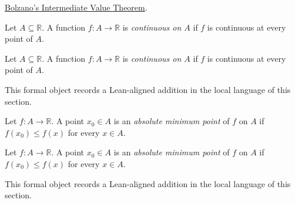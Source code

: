 \begin{dependencies}
\hyperref[thm:bolzano-intermediate-value]{Bolzano's Intermediate Value Theorem}.
\end{dependencies}

\begin{definition}
\label{def:continuous-on}
Let $A\subseteq\mathbb R$. A function $f:A\to\mathbb R$ is \emph{continuous on $A$} if $f$ is continuous at every point of $A$.
\end{definition}

\begin{remark*}
Let $A\subseteq\mathbb R$. A function $f:A\to\mathbb R$ is \emph{continuous on $A$} if $f$ is continuous at every point of $A$.
\end{remark*}

\begin{remark*}[Interpretation]
This formal object records a Lean-aligned addition in the local language of this section.
\end{remark*}

\begin{dependencies}
\NoLocalDependencies
\end{dependencies}
\begin{definition}
\label{def:is-absolute-minimum}
Let $f:A\to\mathbb R$. A point $x_0\in A$ is an \emph{absolute minimum point} of $f$ on $A$ if $f(x_0)\le f(x)$ for every $x\in A$.
\end{definition}

\begin{remark*}
Let $f:A\to\mathbb R$. A point $x_0\in A$ is an \emph{absolute minimum point} of $f$ on $A$ if $f(x_0)\le f(x)$ for every $x\in A$.
\end{remark*}

\begin{remark*}[Interpretation]
This formal object records a Lean-aligned addition in the local language of this section.
\end{remark*}

